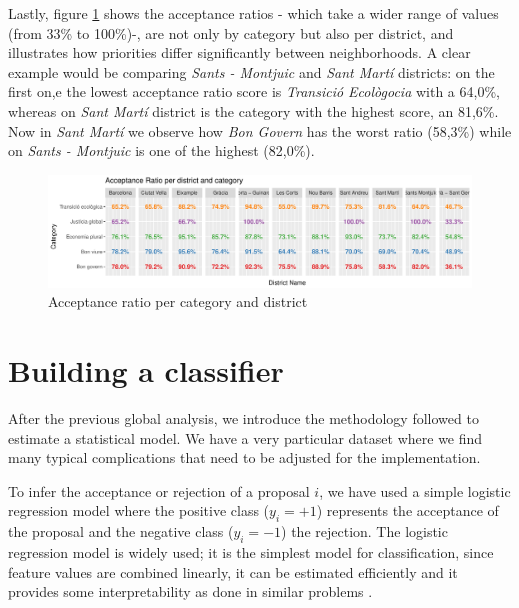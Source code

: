 Lastly, figure \ref{cat_dist} shows the acceptance ratios - which take a wider range of values (from 33\% to 100\%)-, are  not only by category but also per district, and illustrates how priorities differ significantly between neighborhoods. A clear example would be comparing \emph{Sants - Montjuic} and \emph{Sant Mart\'i} districts: on the first on,e the lowest acceptance ratio score is \textit{Transici\'o Ecol\`ogocia} with a 64,0\%, whereas on \emph{Sant Mart\'i} district is the category with the highest score, an 81,6\%. Now in \emph{Sant Mart\'i} we observe how \emph{Bon Govern} has the worst ratio (58,3\%) while on \emph{Sants - Montjuic} is one of the highest (82,0\%).

\begin{figure}[H]
    \centering
    \includegraphics[width=\textwidth]{Figures/dist_cat.pdf}
    \caption{Acceptance ratio per category and district}
    \label{cat_dist}
\end{figure}

\section{Building a classifier}\label{sec:build}

After the previous global analysis, we introduce the methodology followed to estimate a statistical model. We have a very particular dataset where we find many typical 
complications that need to be adjusted for the implementation. 

To infer the acceptance or rejection of a proposal $i$, we have used a simple logistic regression model where the positive class ($y_i = +1$) represents the acceptance of the proposal and the negative class ($y_i=-1$) the rejection. The logistic regression model is widely used; it is the simplest model for classification, since feature values are combined linearly, it can be estimated efficiently and it provides some interpretability as done in similar problems \cite{navarro2017temporal}. 


